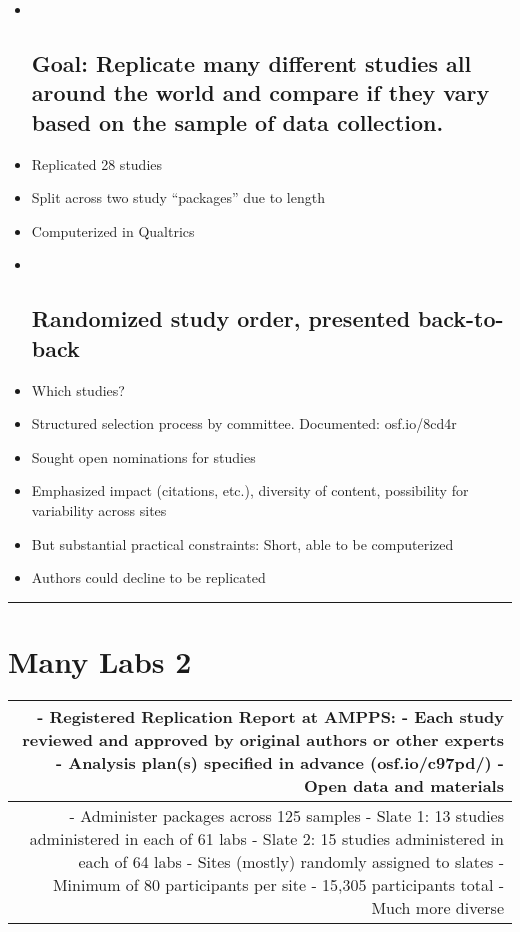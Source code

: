 \documentclass[]{article}
\begin{document}
\begin{itemize}
\item ~
  \subsection{Goal: Replicate many different studies all around the
  world and compare if they vary based on the sample of data
  collection.}\label{goal-replicate-many-different-studies-all-around-the-world-and-compare-if-they-vary-based-on-the-sample-of-data-collection.}
\item
  Replicated 28 studies
\item
  Split across two study ``packages'' due to length
\item
  Computerized in Qualtrics
\item ~
  \subsection{Randomized study order, presented
  back-to-back}\label{randomized-study-order-presented-back-to-back}
\item
  Which studies?
\item
  Structured selection process by committee. Documented: osf.io/8cd4r
\item
  Sought open nominations for studies
\item
  Emphasized impact (citations, etc.), diversity of content, possibility
  for variability across sites
\item
  But substantial practical constraints: Short, able to be computerized
\item
  Authors could decline to be replicated
\end{itemize}

\begin{center}\rule{0.5\linewidth}{\linethickness}\end{center}

\section{Many Labs 2}\label{many-labs-2-2}

\begin{longtable}[]{@{}r@{}}
\toprule
\begin{minipage}[b]{0.03\columnwidth}\raggedleft\strut
- Registered Replication Report at AMPPS: - Each study reviewed and
approved by original authors or other experts - Analysis plan(s)
specified in advance (osf.io/c97pd/) - Open data and materials\strut
\end{minipage}\tabularnewline
\midrule
\endhead
\begin{minipage}[t]{0.03\columnwidth}\raggedleft\strut
- Administer packages across 125 samples - Slate 1: 13 studies
administered in each of 61 labs - Slate 2: 15 studies administered in
each of 64 labs - Sites (mostly) randomly assigned to slates - Minimum
of 80 participants per site - 15,305 participants total - Much more
diverse\strut
\end{minipage}\tabularnewline
\bottomrule
\end{longtable}
\end{document}
